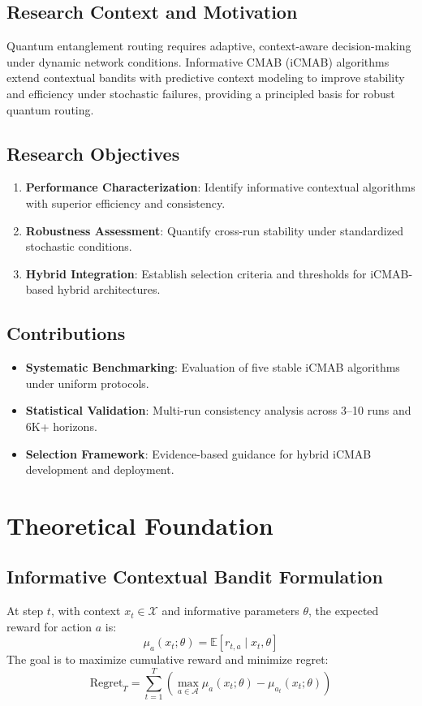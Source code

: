 \documentclass[12pt,a4paper]{article}
\begin{document}
\subsection{Research Context and Motivation}
Quantum entanglement routing requires adaptive, context-aware decision-making under dynamic network conditions. Informative CMAB (iCMAB) algorithms extend contextual bandits with predictive context modeling to improve stability and efficiency under stochastic failures, providing a principled basis for robust quantum routing.

\subsection{Research Objectives}
\begin{enumerate}
\item \textbf{Performance Characterization}: Identify informative contextual algorithms with superior efficiency and consistency.
\item \textbf{Robustness Assessment}: Quantify cross-run stability under standardized stochastic conditions.
\item \textbf{Hybrid Integration}: Establish selection criteria and thresholds for iCMAB-based hybrid architectures.
\end{enumerate}

\subsection{Contributions}
\begin{itemize}
\item \textbf{Systematic Benchmarking}: Evaluation of five stable iCMAB algorithms under uniform protocols.
\item \textbf{Statistical Validation}: Multi-run consistency analysis across 3–10 runs and 6K+ horizons.
\item \textbf{Selection Framework}: Evidence-based guidance for hybrid iCMAB development and deployment.
\end{itemize}

\section{Theoretical Foundation}

\subsection{Informative Contextual Bandit Formulation}
At step $t$, with context $x_t \in \mathcal{X}$ and informative parameters $\theta$, the expected reward for action $a$ is:
\[
\mu_a(x_t; \theta) = \mathbb{E}[r_{t,a} \mid x_t, \theta]
\]
The goal is to maximize cumulative reward and minimize regret:
\[
\mathrm{Regret}_T = \sum_{t=1}^{T}\left(\max_{a \in \mathcal{A}} \mu_a(x_t;\theta) - \mu_{a_t}(x_t;\theta)\right)
\]
\end{document}
